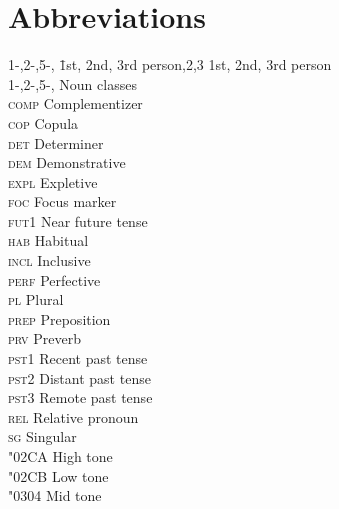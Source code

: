 \documentclass[output=paper,
modfonts
]{langscibook}
\begin{document}
\section*{Abbreviations}
\begin{multicols}{2}
\begin{tabbing}
1-,2-,5-,\hspace{.5em} \= 1st, 2nd, 3rd person,2,3          \> 1st, 2nd, 3rd person\\
1-,2-,5-,      \> Noun classes        \\
\textsc{comp}  \> Complementizer      \\
\textsc{cop}   \> Copula              \\
\textsc{det}   \> Determiner          \\
\textsc{dem}   \> Demonstrative       \\
\textsc{expl}  \> Expletive           \\
\textsc{foc}   \> Focus marker        \\
\textsc{fut1}  \> Near future tense   \\
\textsc{hab}   \> Habitual            \\
\textsc{incl}  \> Inclusive           \\
\textsc{perf}  \> Perfective          \\
\textsc{pl}  \> Plural   \\ 
\textsc{prep}  \> Preposition     \\
\textsc{prv}  \> Preverb   \\
\textsc{pst1}  \> Recent past tense \\
\textsc{pst2}  \> Distant past tense  \\
\textsc{pst3}  \> Remote past tense  \\
\textsc{rel}  \> Relative pronoun\\
\textsc{sg}  \> Singular  \\
\char"02CA \> High tone \\
\char"02CB \> Low tone \\
\hspace{1ex}\char"0304\> Mid tone
\end{tabbing}
\end{multicols}

{\sloppy\printbibliography[heading=subbibliography,notkeyword=this]}
\end{document}
